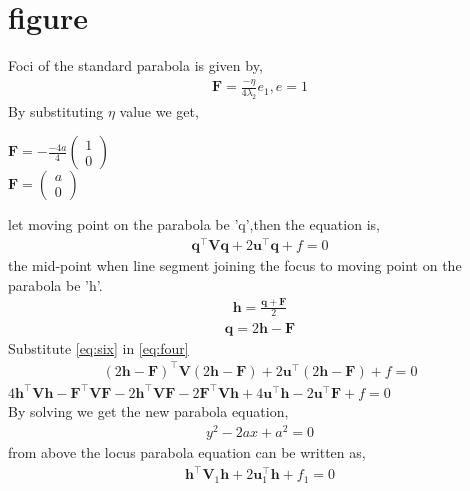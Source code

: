 \documentclass[journal,12pt,twocolumn]{IEEEtran}
\newcommand{\myvec}[1]{\ensuremath{\begin{pmatrix}#1\end{pmatrix}}}
\let\vec\mathbf
\begin{document}
\section{\textbf{figure}}
Foci of the standard parabola is given by,\\
\begin{align}
\label{eq:three}
\vec{F}=\frac{-\eta}{4\lambda_2}e_1 , e=1
\end{align} 
By substituting $\eta$ value we get,\\
\begin{center}
$\vec{F}=-\frac{-4a}{4}\myvec{1\\0}$\\
$\vec{F}=\myvec{a\\0}$
\end{center}
let moving point on the parabola be 'q',then the equation is,
\begin{align}
\label{eq:four}
\vec{q}^\top\vec{Vq}+2\vec{u}^\top\vec{q}+f=0
\end{align}
the mid-point when line segment joining the focus to moving point on the parabola be 'h'.
\begin{align}
\label{eq:five}
\vec{h}=\frac{\vec{q+F}}{2}
\end{align}
\begin{align}
\label{eq:six}
\vec{q}=2\vec{h}-\vec{F}
\end{align}
Substitute \eqref{eq:six} in \eqref{eq:four}\\
\begin{align}
\label{eq:seven}
(2\vec{h}-\vec{F})^\top\vec{V}(2\vec{h}-\vec{F})+2\vec{u}^\top(2\vec{h}-\vec{F})+f=0
\end{align}
$4\vec{h}^\top\vec{Vh}-\vec{F}^\top\vec{VF}-2\vec{h}^\top\vec{VF}-2\vec{F}^\top\vec{Vh}+4\vec{u}^\top\vec{h}-2\vec{u}^\top\vec{F}+f=0$\\
By solving we get the new parabola equation,\\
\begin{align}
\label{eq:ei}
y^2-2ax+a^2=0
\end{align}
from above the locus parabola equation can be written as, \\
\begin{align}
\label{eq:ni}
\vec{h}^\top\vec{V}_{1}\vec{h}+2\vec{u}_{1}^\top\vec{h}+f_1=0
\end{align} 
\end{document}
